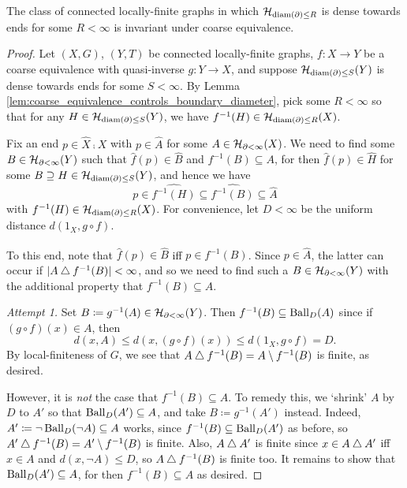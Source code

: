 \documentclass[reqno]{amsart}
\begin{document}
    \begin{proposition}\label{prp:invariant_of_density_coarse_equivalence}
        The class of connected locally-finite graphs in which $\mathcal{H}_{\operatorname{diam}(\partial)\leq R}$ is dense towards ends for some $R<\infty$ is invariant under coarse equivalence.
    \end{proposition}
    \begin{proof}
        Let $(X,G)$, $(Y,T)$ be connected locally-finite graphs, $f:X\to Y$ be a coarse equivalence with quasi-inverse $g:Y\to X$, and suppose $\mathcal{H}_{\operatorname{diam}(\partial)\leq S}(Y)$ is dense towards ends for some $S<\infty$. By Lemma \ref{lem:coarse_equivalence_controls_boundary_diameter}, pick some $R<\infty$ so that for any $H\in\mathcal{H}_{\operatorname{diam}(\partial)\leq S}(Y)$, we have $f^{-1}(H)\in\mathcal{H}_{\operatorname{diam}(\partial)\leq R}(X)$.

        Fix an end $p\in\widehat{X}\comp X$ with $p\in\widehat{A}$ for some $A\in\mathcal{H}_{\partial<\infty}(X)$. We need to find some $B\in\mathcal{H}_{\partial<\infty}(Y)$ such that $\widehat{f}(p)\in\widehat{B}$ and $f^{-1}(B)\subseteq A$, for then $\widehat{f}(p)\in\widehat{H}$ for some $B\supseteq H\in\mathcal{H}_{\operatorname{diam}(\partial)\leq S}(Y)$, and hence we have
        \begin{equation*}
            p\in\widehat{f^{-1}(H)}\subseteq\widehat{f^{-1}(B)}\subseteq\widehat{A}
        \end{equation*}
        with $f^{-1}(H)\in\mathcal{H}_{\operatorname{diam}(\partial)\leq R}(X)$. For convenience, let $D<\infty$ be the uniform distance $d(1_X,g\circ f)$.

        To this end, note that $\widehat{f}(p)\in\widehat{B}$ iff $p\in\widehat{f^{-1}(B)}$. Since $p\in\widehat{A}$, the latter can occur if $|A\bigtriangleup f^{-1}(B)|<\infty$, and so we need to find such a $B\in\mathcal{H}_{\partial<\infty}(Y)$ with the additional property that $f^{-1}(B)\subseteq A$.
        \begin{leftbar}
        \textit{Attempt 1.} Set $B\coloneqq g^{-1}(A)\in\mathcal{H}_{\partial<\infty}(Y)$. Then $f^{-1}(B)\subseteq\operatorname{Ball}_D(A)$ since if $(g\circ f)(x)\in A$, then
                \begin{equation*}
                    d(x,A)\leq d(x,(g\circ f)(x))\leq d(1_X,g\circ f)=D.
                \end{equation*}
            By local-finiteness of $G$, we see that $A\bigtriangleup f^{-1}(B)=A\setminus f^{-1}(B)$ is finite, as desired.
        \end{leftbar}
        However, it is \textit{not} the case that $f^{-1}(B)\subseteq A$. To remedy this, we `shrink' $A$ by $D$ to $A'$ so that $\operatorname{Ball}_D(A')\subseteq A$, and take $B\coloneqq g^{-1}(A')$ instead. Indeed, $A'\coloneqq\lnot\operatorname{Ball}_D(\lnot A)\subseteq A$ works, since $f^{-1}(B)\subseteq\operatorname{Ball}_D(A')$ as before, so $A'\bigtriangleup f^{-1}(B)=A'\setminus f^{-1}(B)$ is finite. Also, $A\bigtriangleup A'$ is finite since $x\in A\bigtriangleup A'$ iff $x\in A$ and $d(x,\lnot A)\leq D$, so $A\bigtriangleup f^{-1}(B)$ is finite too. It remains to show that $\operatorname{Ball}_D(A')\subseteq A$, for then $f^{-1}(B)\subseteq A$ as desired.


\end{proof}
\end{document}
